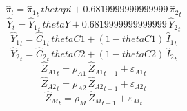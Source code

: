 \begin{dmath}
{{\hat{\pi}}}_{t}={{\hat{\pi}_{1}}}_{t}\, {thetapi}+0.6819999999999999\, {{\hat{\pi}_{2}}}_{t}
\end{dmath}
\begin{dmath}
{{\hat{Y}}}_{t}={{\hat{Y}_{1}}}_{t}\, {thetaY}+0.6819999999999999\, {{\hat{Y}_{2}}}_{t}
\end{dmath}
\begin{dmath}
{{\hat{Y}_{1}}}_{t}={{\hat{C}_{1}}}_{t}\, {thetaC1}+\left(1-{thetaC1}\right)\, {{\hat{I}_{1}}}_{t}
\end{dmath}
\begin{dmath}
{{\hat{Y}_{2}}}_{t}={{\hat{C}_{2}}}_{t}\, {thetaC2}+\left(1-{thetaC2}\right)\, {{\hat{I}_{2}}}_{t}
\end{dmath}
\begin{dmath}
{{\hat{Z}_{A1}}}_{t}={{\rho_{A1}}}\, {{\hat{Z}_{A1}}}_{t-1}+{{\varepsilon_{A1}}}_{t}
\end{dmath}
\begin{dmath}
{{\hat{Z}_{A2}}}_{t}={{\rho_{A2}}}\, {{\hat{Z}_{A2}}}_{t-1}+{{\varepsilon_{A2}}}_{t}
\end{dmath}
\begin{dmath}
{{\hat{Z}_M}}_{t}={{\rho_{M}}}\, {{\hat{Z}_M}}_{t-1}+{{\varepsilon_{M}}}_{t}
\end{dmath}
